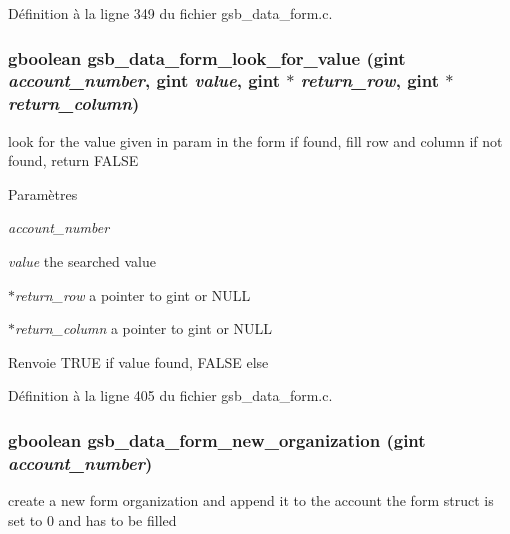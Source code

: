 Définition à la ligne 349 du fichier gsb\_\-data\_\-form.c.

\subsubsection[{gsb\_\-data\_\-form\_\-look\_\-for\_\-value}]{\setlength{\rightskip}{0pt plus 5cm}gboolean gsb\_\-data\_\-form\_\-look\_\-for\_\-value (gint {\em account\_\-number}, \/  gint {\em value}, \/  gint $\ast$ {\em return\_\-row}, \/  gint $\ast$ {\em return\_\-column})}\label{gsb__data__form_8h_a011611d3aa6cecc0c619981f69bf2a6e}
look for the value given in param in the form if found, fill row and column if not found, return FALSE


\begin{DoxyParams}{Paramètres}
\item[{\em account\_\-number}]\item[{\em value}]the searched value \item[{\em $\ast$return\_\-row}]a pointer to gint or NULL \item[{\em $\ast$return\_\-column}]a pointer to gint or NULL\end{DoxyParams}
\begin{DoxyReturn}{Renvoie}
TRUE if value found, FALSE else 
\end{DoxyReturn}


Définition à la ligne 405 du fichier gsb\_\-data\_\-form.c.

\subsubsection[{gsb\_\-data\_\-form\_\-new\_\-organization}]{\setlength{\rightskip}{0pt plus 5cm}gboolean gsb\_\-data\_\-form\_\-new\_\-organization (gint {\em account\_\-number})}\label{gsb__data__form_8h_a8e695941eaf64be2d15afd287e064523}
create a new form organization and append it to the account the form struct is set to 0 and has to be filled


